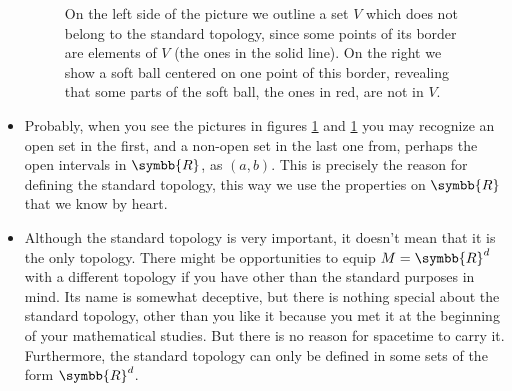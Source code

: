 \begin{itemize}
\begin{figure}[ht]
\begin{minipage}{.45\linewidth}
    \end{minipage}  
    \caption{On the left side of the picture we outline a set $V$ which does
      not belong to the standard topology, since some points of its border are
      elements of $V$ (the ones in the solid line).
      On the right we show a soft ball centered on one point of this border,
      revealing that some parts of the soft ball, the ones in red, are not in
      $V$.}
    \label{fig:topspac-nonopen-nonclosed-set}
  \end{figure}

\item Probably, when you see the pictures in figures
  \ref{fig:topspac-nonopen-nonclosed-set} and
  \ref{fig:topspac-nonopen-nonclosed-set}
  you may recognize an open set in the first, and a non-open set in the last
  one from, perhaps the open intervals in $\symbb{R}$, as $(a,b)$.
  This is precisely the reason for defining the standard topology, this way
  we use the properties on $\symbb{R}$ that we know by heart.


\item Although the standard topology is very important, it doesn't mean that it
  is the only topology.
  There might be opportunities to equip $M=\symbb{R}^d$ with a different
  topology if you have other than the standard purposes in mind.
  Its name is somewhat deceptive, but there is nothing special about the
  standard topology, other than you like it because you met it at the beginning
  of your mathematical studies. But there is no reason for spacetime to carry
  it. Furthermore, the standard topology can only be defined in some sets of
  the form $\symbb{R}^d$.

\end{itemize}


